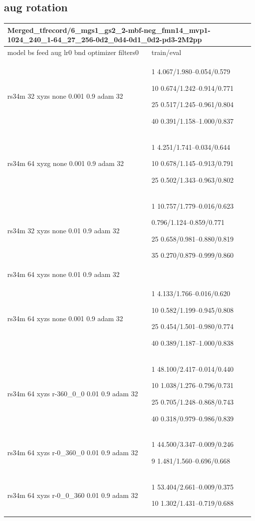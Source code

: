 \documentclass[,table,dvipsnames]{article}
\begin{document}
\subsection{aug rotation}
\noindent\begin{tabular}{|p{9cm}|p{6cm}| }	
	\hline
	\multicolumn{2}{|p{15cm}|}{Merged\_tfrecord/6\_mgs1\_gs2\_2-mbf-neg\_fmn14\_mvp1-1024\_240\_1-64\_27\_256-0d2\_0d4-0d1\_0d2-pd3-2M2pp}\\
	\hline
	model bs feed aug lr0 bnd optimizer filters0 & train/eval \\
	
	\rowcolor{green!20}
	 rs34m 32 xyzs none 0.001 0.9 adam 32 & 1 4.067/1.980--0.054/0.579\par 10 0.674/1.242--0.914/0.771\par 25 0.517/1.245--0.961/0.804\par 40 0.391/1.158--1.000/0.837\\
	 
	\rowcolor{yellow!20}
	rs34m 64 xyzg none 0.001 0.9 adam 32 & 1 4.251/1.741--0.034/0.644\par 10 0.678/1.145--0.913/0.791\par 25 0.502/1.343--0.963/0.802\\
	
	\rowcolor{blue!20}
	rs34m 32 xyzs none 0.01 0.9 adam 32& 1 10.757/1.779--0.016/0.623\par 0.796/1.124--0.859/0.771\par 25 0.658/0.981--0.880/0.819\par 35 0.270/0.879--0.999/0.860\\
	
	\rowcolor{Orange!20}
	rs34m 64 xyzs none 0.01 0.9 adam 32& \\
	
	\rowcolor{red!20}
	rs34m 64 xyzs none 0.001 0.9 adam 32& 1 4.133/1.766--0.016/0.620\par 10 0.582/1.199--0.945/0.808\par 25 0.454/1.501--0.980/0.774\par  40 0.389/1.187--1.000/0.838\\
	
	\rowcolor{green!20}
	rs34m 64 xyzs r-360\_0\_0 0.01 0.9 adam 32& 1 48.100/2.417--0.014/0.440\par 10 1.038/1.276--0.796/0.731\par 25 0.705/1.248--0.868/0.743\par 40 0.318/0.979--0.986/0.839\\
	
	\rowcolor{yellow!20}
	rs34m 64 xyzs r-0\_360\_0 0.01 0.9 adam 32& 1 44.500/3.347--0.009/0.246\par 9 1.481/1.560--0.696/0.668\par \\
	
	\rowcolor{blue!20}
	rs34m 64 xyzs r-0\_0\_360 0.01 0.9 adam 32& 1 53.404/2.661--0.009/0.375\par 10 1.302/1.431--0.719/0.688\\
	
	\hline
	
\end{tabular}
\end{document}
